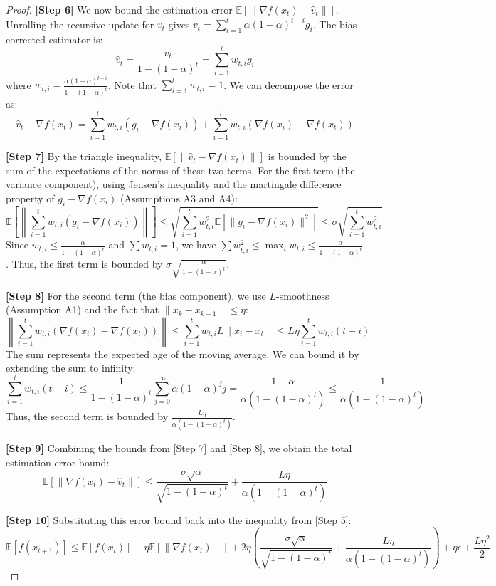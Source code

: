 \documentclass{article}
\begin{document}
\begin{proof}
\textbf{[Step 6]} We now bound the estimation error $\mathbb{E}[\|\nabla f(x_t) - \hat{v}_t\|]$. Unrolling the recursive update for $v_t$ gives $v_t = \sum_{i=1}^t \alpha (1-\alpha)^{t-i} g_i$. The bias-corrected estimator is:
$$ \hat{v}_t = \frac{v_t}{1 - (1-\alpha)^t} = \sum_{i=1}^t w_{t,i} g_i $$
where $w_{t,i} = \frac{\alpha (1-\alpha)^{t-i}}{1 - (1-\alpha)^t}$. Note that $\sum_{i=1}^t w_{t,i} = 1$. We can decompose the error as:
$$ \hat{v}_t - \nabla f(x_t) = \sum_{i=1}^t w_{t,i} (g_i - \nabla f(x_i)) + \sum_{i=1}^t w_{t,i} (\nabla f(x_i) - \nabla f(x_t)) $$

\textbf{[Step 7]} By the triangle inequality, $\mathbb{E}[\|\hat{v}_t - \nabla f(x_t)\|]$ is bounded by the sum of the expectations of the norms of these two terms. For the first term (the variance component), using Jensen's inequality and the martingale difference property of $g_i - \nabla f(x_i)$ (Assumptions A3 and A4):
$$ \mathbb{E}\left[\left\| \sum_{i=1}^t w_{t,i} (g_i - \nabla f(x_i)) \right\|\right] \le \sqrt{ \sum_{i=1}^t w_{t,i}^2 \mathbb{E}[\|g_i - \nabla f(x_i)\|^2] } \le \sigma \sqrt{ \sum_{i=1}^t w_{t,i}^2 } $$
Since $w_{t,i} \le \frac{\alpha}{1 - (1-\alpha)^t}$ and $\sum w_{t,i} = 1$, we have $\sum w_{t,i}^2 \le \max_i w_{t,i} \le \frac{\alpha}{1 - (1-\alpha)^t}$. Thus, the first term is bounded by $\sigma \sqrt{\frac{\alpha}{1 - (1-\alpha)^t}}$.

\textbf{[Step 8]} For the second term (the bias component), we use $L$-smoothness (Assumption A1) and the fact that $\|x_k - x_{k-1}\| \le \eta$:
$$ \left\| \sum_{i=1}^t w_{t,i} (\nabla f(x_i) - \nabla f(x_t)) \right\| \le \sum_{i=1}^t w_{t,i} L \|x_i - x_t\| \le L\eta \sum_{i=1}^t w_{t,i} (t - i) $$
The sum represents the expected age of the moving average. We can bound it by extending the sum to infinity:
$$ \sum_{i=1}^t w_{t,i} (t - i) \le \frac{1}{1 - (1-\alpha)^t} \sum_{j=0}^\infty \alpha (1-\alpha)^j j = \frac{1-\alpha}{\alpha(1 - (1-\alpha)^t)} \le \frac{1}{\alpha(1 - (1-\alpha)^t)} $$
Thus, the second term is bounded by $\frac{L\eta}{\alpha(1 - (1-\alpha)^t)}$.

\textbf{[Step 9]} Combining the bounds from [Step 7] and [Step 8], we obtain the total estimation error bound:
$$ \mathbb{E}[\|\nabla f(x_t) - \hat{v}_t\|] \le \frac{\sigma\sqrt{\alpha}}{\sqrt{1 - (1-\alpha)^t}} + \frac{L\eta}{\alpha(1 - (1-\alpha)^t)} $$

\textbf{[Step 10]} Substituting this error bound back into the inequality from [Step 5]:
$$ \mathbb{E}[f(x_{t+1})] \le \mathbb{E}[f(x_t)] - \eta \mathbb{E}[\|\nabla f(x_t)\|] + 2\eta \left( \frac{\sigma\sqrt{\alpha}}{\sqrt{1 - (1-\alpha)^t}} + \frac{L\eta}{\alpha(1 - (1-\alpha)^t)} \right) + \eta\epsilon + \frac{L\eta^2}{2} $$


\end{proof}
\end{document}
